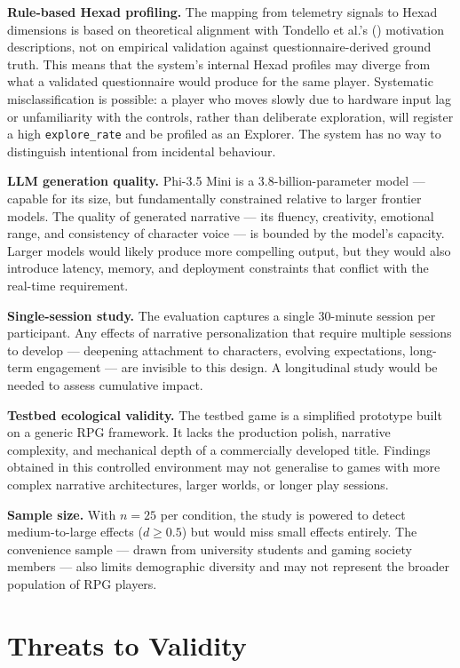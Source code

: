 \textbf{Rule-based Hexad profiling.} The mapping from telemetry signals to Hexad dimensions is based on theoretical alignment with Tondello et al.'s (\citeyear{tondello2016hexad}) motivation descriptions, not on empirical validation against questionnaire-derived ground truth. This means that the system's internal Hexad profiles may diverge from what a validated questionnaire would produce for the same player. Systematic misclassification is possible: a player who moves slowly due to hardware input lag or unfamiliarity with the controls, rather than deliberate exploration, will register a high \texttt{explore\_rate} and be profiled as an Explorer. The system has no way to distinguish intentional from incidental behaviour.

\textbf{LLM generation quality.} Phi-3.5 Mini is a 3.8-billion-parameter model --- capable for its size, but fundamentally constrained relative to larger frontier models. The quality of generated narrative --- its fluency, creativity, emotional range, and consistency of character voice --- is bounded by the model's capacity. Larger models would likely produce more compelling output, but they would also introduce latency, memory, and deployment constraints that conflict with the real-time requirement.

\textbf{Single-session study.} The evaluation captures a single 30-minute session per participant. Any effects of narrative personalization that require multiple sessions to develop --- deepening attachment to characters, evolving expectations, long-term engagement --- are invisible to this design. A longitudinal study would be needed to assess cumulative impact.

\textbf{Testbed ecological validity.} The testbed game is a simplified prototype built on a generic RPG framework. It lacks the production polish, narrative complexity, and mechanical depth of a commercially developed title. Findings obtained in this controlled environment may not generalise to games with more complex narrative architectures, larger worlds, or longer play sessions.

\textbf{Sample size.} With $n = 25$ per condition, the study is powered to detect medium-to-large effects ($d \geq 0.5$) but would miss small effects entirely. The convenience sample --- drawn from university students and gaming society members --- also limits demographic diversity and may not represent the broader population of RPG players.

\section{Threats to Validity}

